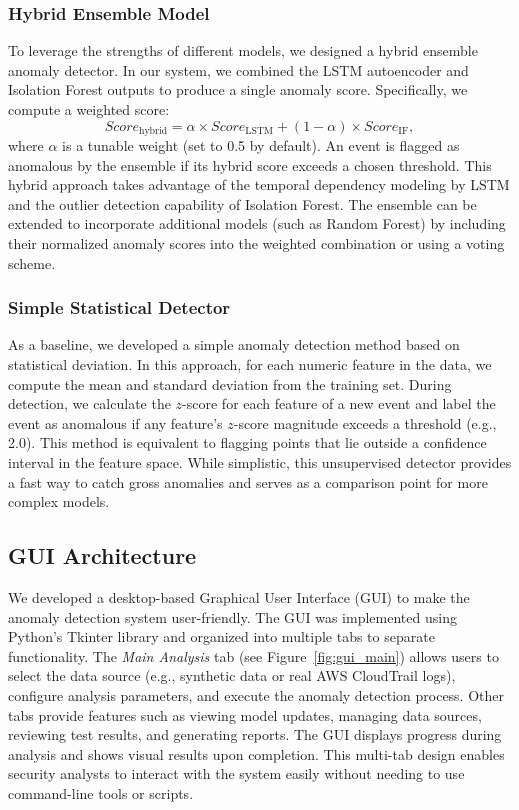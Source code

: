 \documentclass[conference]{IEEEtran}
\begin{document}
\subsubsection{Hybrid Ensemble Model}
To leverage the strengths of different models, we designed a hybrid ensemble anomaly detector. In our system, we combined the LSTM autoencoder and Isolation Forest outputs to produce a single anomaly score. Specifically, we compute a weighted score:
\begin{equation}
Score_{\text{hybrid}} = \alpha \times Score_{\text{LSTM}} + (1-\alpha) \times Score_{\text{IF}},
\end{equation}
where $\alpha$ is a tunable weight (set to 0.5 by default). An event is flagged as anomalous by the ensemble if its hybrid score exceeds a chosen threshold. This hybrid approach takes advantage of the temporal dependency modeling by LSTM and the outlier detection capability of Isolation Forest. The ensemble can be extended to incorporate additional models (such as Random Forest) by including their normalized anomaly scores into the weighted combination or using a voting scheme.

\subsubsection{Simple Statistical Detector}
As a baseline, we developed a simple anomaly detection method based on statistical deviation. In this approach, for each numeric feature in the data, we compute the mean and standard deviation from the training set. During detection, we calculate the $z$-score for each feature of a new event and label the event as anomalous if any feature's $z$-score magnitude exceeds a threshold (e.g., 2.0). This method is equivalent to flagging points that lie outside a confidence interval in the feature space. While simplistic, this unsupervised detector provides a fast way to catch gross anomalies and serves as a comparison point for more complex models.

\subsection{GUI Architecture}
We developed a desktop-based Graphical User Interface (GUI) to make the anomaly detection system user-friendly. The GUI was implemented using Python's Tkinter library and organized into multiple tabs to separate functionality. The \textit{Main Analysis} tab (see Figure~\ref{fig:gui_main}) allows users to select the data source (e.g., synthetic data or real AWS CloudTrail logs), configure analysis parameters, and execute the anomaly detection process. Other tabs provide features such as viewing model updates, managing data sources, reviewing test results, and generating reports. The GUI displays progress during analysis and shows visual results upon completion. This multi-tab design enables security analysts to interact with the system easily without needing to use command-line tools or scripts.
\end{document}
